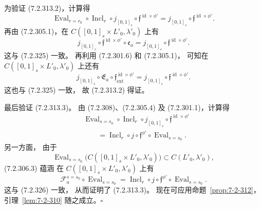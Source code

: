 为验证 (7.2.313.2)，计算得
\begin{equation}
\operatorname{Eval}_{r=r_0}\circ\operatorname{Incl}_r
\circ j_{[0,1]_s}\circ
\mathfrak f^{\operatorname{id}\times\phi'}
=j_{[0,1]_s}\circ
\mathfrak f^{\operatorname{id}\times\phi'}.
\tag{7.2.325}\label{eq:7-2-325}
\end{equation}
再由 (7.2.305.1)，在
$C([0,1]_s\times L'_0,\lambda'_0)$
上有
\[
j_{[0,1]_s}\circ
\mathfrak f^{\operatorname{id}\times\phi'}
\circ\mathfrak e_a
=j_{[0,1]_s}\circ
\mathfrak f^{\operatorname{id}\times\phi'}.
\]
这与 (7.2.325) 一致。
再利用 (7.2.301.6) 和 (7.2.305.1)，
可知在
$C([0,1]_s\times L'_0,\lambda'_0)$
上还有
\[
j_{[0,1]_s}\circ\mathfrak E_a\circ
\mathfrak f^{\operatorname{id}\times\phi'}_{\mathrm{ext}}
=j_{[0,1]_s}\circ
\mathfrak f^{\operatorname{id}\times\phi'}.
\]
这也与 (7.2.325) 一致，
故 (7.2.313.2) 得证。

最后验证 (7.2.313.3)。
由 (7.2.308)、(7.2.305.4)
及 (7.2.301.1)，计算得
\begin{equation}
\begin{aligned}
&\operatorname{Eval}_{s=s_0}\circ
\operatorname{Incl}_r\circ j_{[0,1]_s}
\circ\mathfrak f^{\operatorname{id}\times\phi'}\\
&\qquad
=\operatorname{Incl}_r\circ j\circ\mathfrak f^{\phi'}
\circ\operatorname{Eval}_{s=s_0}.
\end{aligned}
\tag{7.2.326}\label{eq:7-2-326}
\end{equation}
另一方面，
由于
\[
\operatorname{Eval}_{s=s_0}
\bigl(C([0,1]_s\times L'_0,\lambda'_0)\bigr)
\subset C(L'_0,\lambda'_0),
\]
(7.2.306.3) 蕴涵
在 $C([0,1]_s\times L'_0,\lambda'_0)$ 上有
\[
\mathcal F_a^{s=s_0}\circ\operatorname{Eval}_{s=s_0}
=\operatorname{Incl}_r\circ j\circ\mathfrak f^{\phi'}
\circ\operatorname{Eval}_{s=s_0}.
\]
这与 (7.2.326) 一致，
从而证明了 (7.2.313.3)。
现在可应用命题~\ref{prop:7-2-312}，
引理~\ref{lem:7-2-310} 随之成立。\(\square\)
